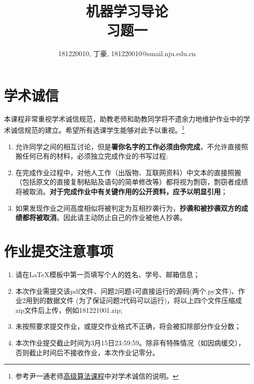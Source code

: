 \documentclass[a4paper,UTF8]{article}
\theoremstyle{definition}
\begin{document}
\title{机器学习导论\\习题一}
\author{181220010, 丁豪, 181220010@smail.nju.edu.cn}
\maketitle


\section*{学术诚信}

本课程非常重视学术诚信规范，助教老师和助教同学将不遗余力地维护作业中的学术诚信规范的建立。希望所有选课学生能够对此予以重视。\footnote{参考尹一通老师\href{http://tcs.nju.edu.cn/wiki/}{高级算法课程}中对学术诚信的说明。}

\begin{tcolorbox}
	\begin{enumerate}
		\item[(1)] 允许同学之间的相互讨论，但是{\color{red}\textbf{署你名字的工作必须由你完成}}，不允许直接照搬任何已有的材料，必须独立完成作业的书写过程;
		\item[(2)] 在完成作业过程中，对他人工作（出版物、互联网资料）中文本的直接照搬（包括原文的直接复制粘贴及语句的简单修改等）都将视为剽窃，剽窃者成绩将被取消。{\color{red}\textbf{对于完成作业中有关键作用的公开资料，应予以明显引用}}；
		\item[(3)] 如果发现作业之间高度相似将被判定为互相抄袭行为，{\color{red}\textbf{抄袭和被抄袭双方的成绩都将被取消}}。因此请主动防止自己的作业被他人抄袭。
	\end{enumerate}
\end{tcolorbox}

\section*{作业提交注意事项}
\begin{tcolorbox}
	\begin{enumerate}
		\item[(1)] 请在LaTeX模板中第一页填写个人的姓名、学号、邮箱信息；
		\item[(2)] 本次作业需提交该pdf文件、问题2问题4可直接运行的源码(两个.py文件)、作业2用到的数据文件 (为了保证问题2代码可以运行)，将以上四个文件压缩成zip文件后上传，例如181221001.zip;
		\item[(3)] 未按照要求提交作业，或提交作业格式不正确，将会被扣除部分作业分数；
		\item[(4)] 本次作业提交截止时间为3月15日23:59:59。除非有特殊情况（如因病缓交），否则截止时间后不接收作业，本次作业记零分。
	\end{enumerate}
\end{tcolorbox}
\end{document}

